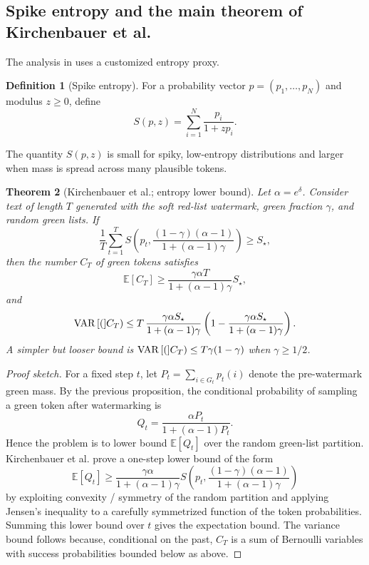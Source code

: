 \documentclass[11pt]{article}
\newtheorem{theorem}{Theorem}[section]
\theoremstyle{definition}
\newtheorem{definition}[theorem]{Definition}
\newcommand{\E}{\mathbb{E}}
\newcommand{\1}{\mathbf{1}}
\begin{document}
\subsection{Spike entropy and the main theorem of Kirchenbauer et al.}

The analysis in \cite{kirchenbauer2023watermark} uses a customized entropy proxy.

\begin{definition}[Spike entropy]
For a probability vector $p=(p_1,\dots,p_N)$ and modulus $z\ge 0$, define
\[
S(p,z) = \sum_{i=1}^N \frac{p_i}{1+z p_i}.
\]
\end{definition}

The quantity $S(p,z)$ is small for spiky, low-entropy distributions and larger when mass is spread across many plausible tokens.

\begin{theorem}[Kirchenbauer et al.; entropy lower bound]\label{thm:kgw-main}
Let $\alpha=e^{\delta}$. Consider text of length $T$ generated with the soft red-list watermark, green fraction $\gamma$, and random green lists. If
\[
\frac1T\sum_{t=1}^T S\!\left(p_t,\frac{(1-\gamma)(\alpha-1)}{1+(\alpha-1)\gamma}\right) \ge S_\star,
\]
then the number $C_T$ of green tokens satisfies
\[
\E[C_T] \ge \frac{\gamma\alpha T}{1+(\alpha-1)\gamma} S_\star,
\]
and
\[
\Var(C_T) \le
T\,\frac{\gamma\alpha S_\star}{1+(\alpha-1)\gamma}
\left(1-\frac{\gamma\alpha S_\star}{1+(\alpha-1)\gamma}\right).
\]
A simpler but looser bound is $\Var(C_T)\le T\gamma(1-\gamma)$ when $\gamma\ge 1/2$.
\end{theorem}

\begin{proof}[Proof sketch]
For a fixed step $t$, let $P_t=\sum_{i\in G_t} p_t(i)$ denote the pre-watermark green mass. By the previous proposition, the conditional probability of sampling a green token after watermarking is
\[
Q_t = \frac{\alpha P_t}{1+(\alpha-1)P_t}.
\]
Hence the problem is to lower bound $\E[Q_t]$ over the random green-list partition. Kirchenbauer et al. prove a one-step lower bound of the form
\[
\E[Q_t] \ge \frac{\gamma\alpha}{1+(\alpha-1)\gamma}
S\!\left(p_t,\frac{(1-\gamma)(\alpha-1)}{1+(\alpha-1)\gamma}\right)
\]
by exploiting convexity / symmetry of the random partition and applying Jensen's inequality to a carefully symmetrized function of the token probabilities. Summing this lower bound over $t$ gives the expectation bound. The variance bound follows because, conditional on the past, $C_T$ is a sum of Bernoulli variables with success probabilities bounded below as above.
\end{proof}
\end{document}
